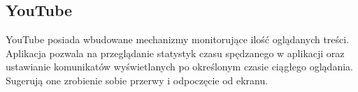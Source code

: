 \bigskip
{}

\subsection{YouTube}
YouTube posiada wbudowane mechanizmy monitorujące ilość oglądanych treści. Aplikacja pozwala na przeglądanie statystyk czasu spędzanego w aplikacji oraz ustawianie komunikatów wyświetlanych po określonym czasie ciągłego oglądania. Sugerują one zrobienie sobie przerwy i odpoczęcie od ekranu.

\bigskip
{}
